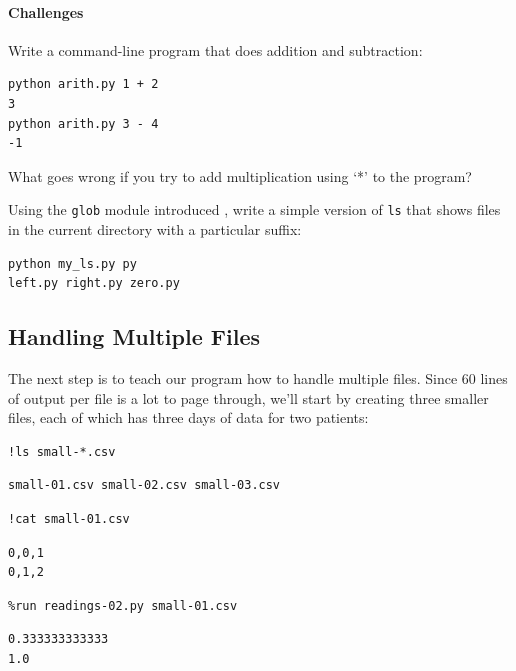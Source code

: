 \documentclass{book}
\begin{document}
\mbox{}\paragraph{Challenges}

\begin{swcenumerate}
\item
  Write a command-line program that does addition and subtraction:
\begin{verbatim}
python arith.py 1 + 2
3
python arith.py 3 - 4
-1
\end{verbatim}
  What goes wrong if you try to add multiplication using `*' to the
  program?
\item
  Using the \texttt{glob} module introduced
  , write a simple version of \texttt{ls}
  that shows files in the current directory with a particular suffix:
\begin{verbatim}
python my_ls.py py
left.py right.py zero.py
\end{verbatim}
\end{swcenumerate}

\subsection{Handling Multiple Files}

The next step is to teach our program how to handle multiple files.
Since 60 lines of output per file is a lot to page through, we'll start
by creating three smaller files, each of which has three days of data
for two patients:

\begin{verbatim}
!ls small-*.csv
\end{verbatim}

\begin{verbatim}
small-01.csv small-02.csv small-03.csv
\end{verbatim}

\begin{verbatim}
!cat small-01.csv
\end{verbatim}

\begin{verbatim}
0,0,1
0,1,2
\end{verbatim}

\begin{verbatim}
%run readings-02.py small-01.csv
\end{verbatim}

\begin{verbatim}
0.333333333333
1.0
\end{verbatim}
\end{document}
